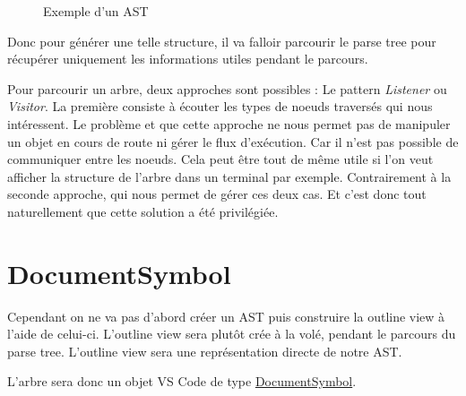\documentclass[
    iict, %
    il, %
]{heig-tb}
\begin{document}
\begin{figure}[!h]
    \begin{center}
    \end{center}
    \caption[Exemple d'un AST]{\label{ast} Exemple d'un AST}
\end{figure}

Donc pour générer une telle structure, il va falloir parcourir le parse tree pour récupérer uniquement les informations utiles pendant le parcours.

Pour parcourir un arbre, deux approches sont possibles : Le pattern \emph{Listener} ou \emph{Visitor}.
La première consiste à écouter les types de noeuds traversés qui nous intéressent. Le problème et que cette approche ne nous permet pas de manipuler un objet en cours de route ni gérer le flux d'exécution.
Car il n'est pas possible de communiquer entre les noeuds. Cela peut être tout de même utile si l'on veut afficher la structure de l'arbre dans un terminal par exemple.
Contrairement à la seconde approche, qui nous permet de gérer ces deux cas. Et c'est donc tout naturellement que cette solution a été privilégiée.

\section{DocumentSymbol}

Cependant on ne va pas d'abord créer un AST puis construire la outline view à l'aide de celui-ci.
L'outline view sera plutôt crée à la volé, pendant le parcours du parse tree. L'outline view sera une représentation directe de notre AST.

L'arbre sera donc un objet VS Code de type \href{https://code.visualstudio.com/api/references/vscode-api#DocumentSymbol}{DocumentSymbol}.
\end{document}
